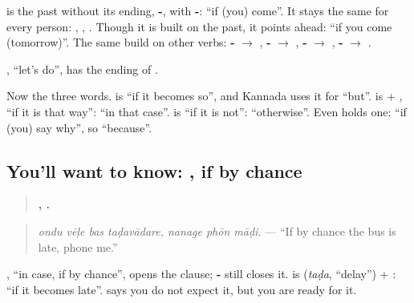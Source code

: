 \textbf{} is the past without its ending, \textbf{-}, with \textbf{-}: \textquotedblleft{}if (you) come\textquotedblright{}. It stays the same for every person: \textbf{ }, \textbf{ }, \textbf{ }. Though it is built on the past, it points ahead: \textquotedblleft{}if you come (tomorrow)\textquotedblright{}. The same build on other verbs: \textbf{-} $\to$ \textbf{}, \textbf{-} $\to$ \textbf{}, \textbf{-} $\to$ \textbf{}, \textbf{-} $\to$ \textbf{}.

\textbf{}, \textquotedblleft{}let's do\textquotedblright{}, has the ending of \textbf{ }.

Now the three words. \textbf{} is \textquotedblleft{}if it becomes so\textquotedblright{}, and Kannada uses it for \textquotedblleft{}but\textquotedblright{}. \textbf{} is \textbf{} + \textbf{}, \textquotedblleft{}if it is that way\textquotedblright{}: \textquotedblleft{}in that case\textquotedblright{}. \textbf{} is \textquotedblleft{}if it is not\textquotedblright{}: \textquotedblleft{}otherwise\textquotedblright{}. Even \textbf{} holds one: \textquotedblleft{}if (you) say why\textquotedblright{}, so \textquotedblleft{}because\textquotedblright{}.

\subsection*{You'll want to know:  , if by chance}
\begin{quote}
\textbf{   ,   .}
\end{quote}

\begin{quote}
\emph{ondu vēḷe bas taḍavādare, nanage phōn māḍi.} — \textquotedblleft{}If by chance the bus is late, phone me.\textquotedblright{}
\end{quote}

\textbf{ }, \textquotedblleft{}in case, if by chance\textquotedblright{}, opens the clause; \textbf{-} still closes it. \textbf{} is \textbf{} (\emph{taḍa}, \textquotedblleft{}delay\textquotedblright{}) + \textbf{}: \textquotedblleft{}if it becomes late\textquotedblright{}. \textbf{ } says you do not expect it, but you are ready for it.

